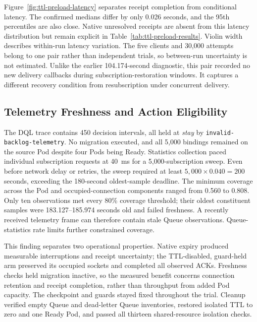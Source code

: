 Figure~\ref{fig:ttl-preload-latency} separates receipt completion from
conditional latency. The confirmed medians differ
by only 0.026 seconds, and the 95th percentiles are also close. Native unresolved
receipts are absent from this latency distribution but remain explicit in
Table~\ref{tab:ttl-preload-results}. Violin width describes within-run latency
variation. The five clients and 30,000 attempts belong to one pair rather than
independent trials, so between-run uncertainty is not estimated. Unlike the
earlier 104.174-second diagnostic, this pair recorded no new delivery callbacks
during subscription-restoration windows. It captures a different recovery
condition from resubscription under concurrent delivery.

\subsection{Telemetry Freshness and Action Eligibility}

The DQL trace contains 450 decision intervals, all held at \emph{stay} by
\texttt{invalid-backlog-telemetry}. No migration executed, and all 5,000 bindings
remained on the source Pod despite four Pods being Ready. Statistics collection
paced individual subscription requests at 40~ms for a 5,000-subscription sweep.
Even before network delay or retries, the sweep required at least
$5{,}000\times0.040=200$ seconds, exceeding the 180-second oldest-sample deadline.
The minimum coverage across the Pod and occupied-connection components ranged
from 0.560 to 0.808. Only ten observations met every 80\% coverage threshold;
their oldest constituent samples were 183.127--185.974 seconds old and failed
freshness. A recently received telemetry frame can therefore contain stale
Queue observations. Queue-statistics rate limits further constrained coverage.

This finding separates two operational properties. Native expiry produced
measurable interruptions and receipt uncertainty; the TTL-disabled, guard-held
arm preserved its occupied sockets and completed all observed ACKs. Freshness
checks held migration inactive, so the measured benefit concerns connection
retention and receipt completion, rather than throughput from added Pod
capacity. The checkpoint and guards stayed fixed throughout the trial.
Cleanup verified empty Queue and
dead-letter Queue inventories, restored isolated TTL to zero and one Ready Pod,
and passed all thirteen shared-resource isolation checks.


